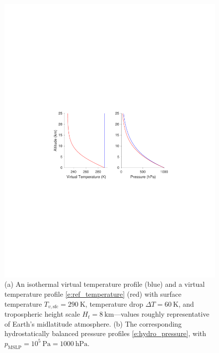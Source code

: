 \documentclass{report}
\begin{document}
\begin{figure}
    \centering
    \includegraphics{figures/hydrostatic_state.pdf}
    \caption{(a) An isothermal virtual temperature profile (blue) and a virtual temperature profile \eqref{e:ref_temperature} (red) with surface temperature $T_{v, \mathrm{sfc}} = 290~\mathrm{K}$, temperature drop $\Delta T = 60~\mathrm{K}$, and tropospheric height scale $H_{t} = 8~\mathrm{km}$---values roughly representative of Earth's midlatitude atmosphere. (b) The corresponding hydrostatically balanced pressure profiles \eqref{e:hydro_pressure}, with $p_{\mathrm{MSLP}} = 10^5~\mathrm{Pa} = 1000~\mathrm{hPa}$.}
    \label{f:hydrostatic_state}
\end{figure}
\end{document}
